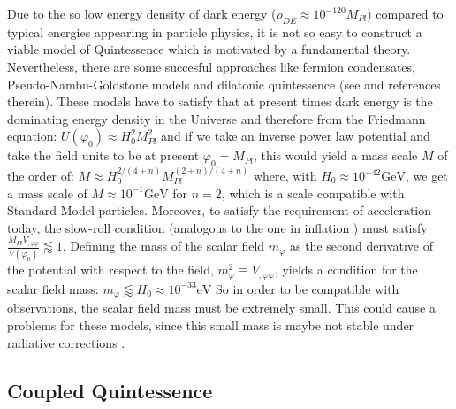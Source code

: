 Due to the so low energy density of dark energy ($\rho_{DE} \approx 10 ^{-120} M_{Pl}$)
compared to typical energies appearing in particle physics, it is not so easy to construct a 
viable model of Quintessence which is motivated by a fundamental theory. Nevertheless, there are 
some succesful approaches like fermion condensates, Pseudo-Nambu-Goldstone models and 
dilatonic quintessence (see \cite{amendola_dark_2010} and references therein).
These models have to satisfy that at present times dark energy is the dominating 
energy density in the Universe and therefore from the Friedmann equation:
\beeqc$
U(\varphi_0) \approx H_0^2 M_{Pl}^2
$
and if we take an inverse power law potential and take the field units to be at present $\varphi_0 = M_{Pl}$,
this would yield a mass scale $M$ of the order
of:
\beeqc$
M \approx H_0^{2/(4+n)} M_{Pl}^{(2+n)/(4+n)}
$
where, with $H_0 \approx 10^{-42} \mathrm{GeV} $, we get a mass scale of $M \approx 10^{-1} \mathrm{GeV}$
for $n=2$, which is a scale compatible with Standard Model particles.
Moreover, to satisfy the requirement of acceleration today, 
the slow-roll condition (analogous to the one in inflation \cite{infl}) must satisfy 
$ \frac{M_{Pl} V_{,\varphi \varphi}}{V(\varphi_0)} \lessapprox 1$.
Defining the mass of the scalar field $m_\varphi$ as the second derivative of the potential with respect to the field,
$m^2_\varphi \equiv  V_{,\varphi \varphi} $, yields a condition for the scalar field mass:
\beeqp$
m_\varphi \lessapprox H_0 \approx 10^{-33} \mathrm{eV}
$
So in order to be compatible with observations, 
the scalar field mass must be extremely small.
This could cause a problems for these models,
since this small mass is maybe not stable under radiative corrections
 .

\subsection{Coupled Quintessence \label{sub:CQ}}

